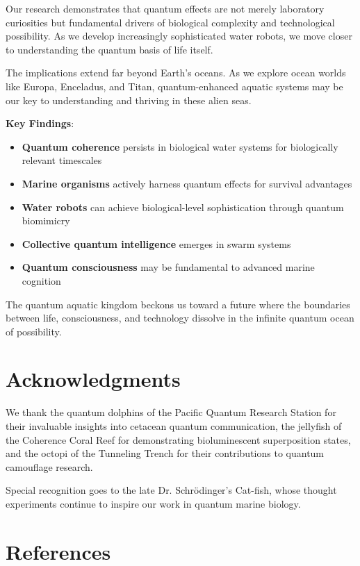\documentclass[11pt,a4paper]{article}
\begin{document}
Our research demonstrates that quantum effects are not merely laboratory curiosities but fundamental drivers of biological complexity and technological possibility. As we develop increasingly sophisticated water robots, we move closer to understanding the quantum basis of life itself.

The implications extend far beyond Earth's oceans. As we explore ocean worlds like Europa, Enceladus, and Titan, quantum-enhanced aquatic systems may be our key to understanding and thriving in these alien seas.

\textbf{Key Findings}:
\begin{itemize}
    \item \textbf{Quantum coherence} persists in biological water systems for biologically relevant timescales
    \item \textbf{Marine organisms} actively harness quantum effects for survival advantages
    \item \textbf{Water robots} can achieve biological-level sophistication through quantum biomimicry
    \item \textbf{Collective quantum intelligence} emerges in swarm systems
    \item \textbf{Quantum consciousness} may be fundamental to advanced marine cognition
\end{itemize}

The quantum aquatic kingdom beckons us toward a future where the boundaries between life, consciousness, and technology dissolve in the infinite quantum ocean of possibility.

\section*{Acknowledgments}

We thank the quantum dolphins of the Pacific Quantum Research Station for their invaluable insights into cetacean quantum communication, the jellyfish of the Coherence Coral Reef for demonstrating bioluminescent superposition states, and the octopi of the Tunneling Trench for their contributions to quantum camouflage research.

Special recognition goes to the late Dr. Schrödinger's Cat-fish, whose thought experiments continue to inspire our work in quantum marine biology.

\section*{References}
\end{document}
